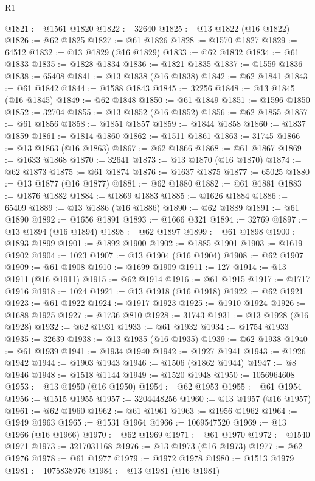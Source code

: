 \begin{lexlean}{R1}
\begin{coremodule}
@1821 := @1561 @1820
@1822 := 32640
@1825 := @13 @1822 (@16 @1822)
@1826 := @62 @1825
@1827 := @61 @1826
@1828 := @1570 @1827
@1829 := 64512
@1832 := @13 @1829 (@16 @1829)
@1833 := @62 @1832
@1834 := @61 @1833
@1835 := @1828 @1834
@1836 := @1821 @1835
@1837 := @1559 @1836
@1838 := 65408
@1841 := @13 @1838 (@16 @1838)
@1842 := @62 @1841
@1843 := @61 @1842
@1844 := @1588 @1843
@1845 := 32256
@1848 := @13 @1845 (@16 @1845)
@1849 := @62 @1848
@1850 := @61 @1849
@1851 := @1596 @1850
@1852 := 32704
@1855 := @13 @1852 (@16 @1852)
@1856 := @62 @1855
@1857 := @61 @1856
@1858 := @1851 @1857
@1859 := @1844 @1858
@1860 := @1837 @1859
@1861 := @1814 @1860
@1862 := @1511 @1861
@1863 := 31745
@1866 := @13 @1863 (@16 @1863)
@1867 := @62 @1866
@1868 := @61 @1867
@1869 := @1633 @1868
@1870 := 32641
@1873 := @13 @1870 (@16 @1870)
@1874 := @62 @1873
@1875 := @61 @1874
@1876 := @1637 @1875
@1877 := 65025
@1880 := @13 @1877 (@16 @1877)
@1881 := @62 @1880
@1882 := @61 @1881
@1883 := @1876 @1882
@1884 := @1869 @1883
@1885 := @1626 @1884
@1886 := 65409
@1889 := @13 @1886 (@16 @1886)
@1890 := @62 @1889
@1891 := @61 @1890
@1892 := @1656 @1891
@1893 := @1666 @321
@1894 := 32769
@1897 := @13 @1894 (@16 @1894)
@1898 := @62 @1897
@1899 := @61 @1898
@1900 := @1893 @1899
@1901 := @1892 @1900
@1902 := @1885 @1901
@1903 := @1619 @1902
@1904 := 1023
@1907 := @13 @1904 (@16 @1904)
@1908 := @62 @1907
@1909 := @61 @1908
@1910 := @1699 @1909
@1911 := 127
@1914 := @13 @1911 (@16 @1911)
@1915 := @62 @1914
@1916 := @61 @1915
@1917 := @1717 @1916
@1918 := 1024
@1921 := @13 @1918 (@16 @1918)
@1922 := @62 @1921
@1923 := @61 @1922
@1924 := @1917 @1923
@1925 := @1910 @1924
@1926 := @1688 @1925
@1927 := @1736 @810
@1928 := 31743
@1931 := @13 @1928 (@16 @1928)
@1932 := @62 @1931
@1933 := @61 @1932
@1934 := @1754 @1933
@1935 := 32639
@1938 := @13 @1935 (@16 @1935)
@1939 := @62 @1938
@1940 := @61 @1939
@1941 := @1934 @1940
@1942 := @1927 @1941
@1943 := @1926 @1942
@1944 := @1903 @1943
@1946 := @1506 (@1862 @1944)
@1947 := @8 @1946
@1948 := @1518 @1144
@1949 := @1520 @1948
@1950 := 1056964608
@1953 := @13 @1950 (@16 @1950)
@1954 := @62 @1953
@1955 := @61 @1954
@1956 := @1515 @1955
@1957 := 3204448256
@1960 := @13 @1957 (@16 @1957)
@1961 := @62 @1960
@1962 := @61 @1961
@1963 := @1956 @1962
@1964 := @1949 @1963
@1965 := @1531 @1964
@1966 := 1069547520
@1969 := @13 @1966 (@16 @1966)
@1970 := @62 @1969
@1971 := @61 @1970
@1972 := @1540 @1971
@1973 := 3217031168
@1976 := @13 @1973 (@16 @1973)
@1977 := @62 @1976
@1978 := @61 @1977
@1979 := @1972 @1978
@1980 := @1513 @1979
@1981 := 1075838976
@1984 := @13 @1981 (@16 @1981)

\end{coremodule}
\end{lexlean}
